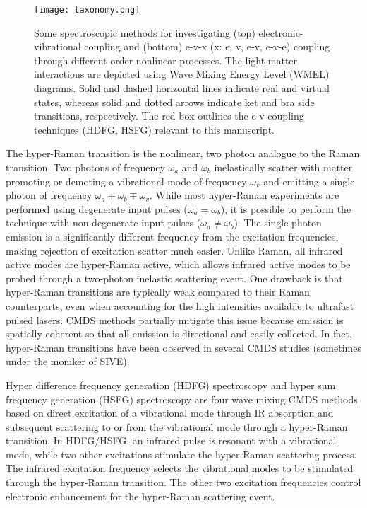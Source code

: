 \documentclass[aip, jcp, reprint, onecolumn, nofootinbib]{revtex4-2}
\begin{document}
\begin{figure}[!htbp]
	\centering
	\texttt{[image: taxonomy.png]}
	\caption{
		Some spectroscopic methods for investigating (top) electronic-vibrational coupling and (bottom) e-v-x (x: e, v, e-v, e-v-e) coupling through different order nonlinear processes.
		The light-matter interactions are depicted using Wave Mixing Energy Level (WMEL) diagrams.\cite{RN286}
		Solid and dashed horizontal lines indicate real and virtual states, whereas solid and dotted arrows indicate ket and bra side transitions, respectively. 
		The red box outlines the e-v coupling techniques (HDFG, HSFG) relevant to this manuscript.
	} 
	\label{fig:comparisonwmel}
\end{figure}

The hyper-Raman transition is the nonlinear, two photon analogue to the Raman transition.\cite{Terhune1965, Cyvin1965, Andrews1978}
Two photons of frequency $\omega_a$ and $\omega_b$ inelastically scatter with matter, promoting or demoting a vibrational mode of frequency $\omega_v$ and emitting a single photon of frequency $\omega_a + \omega_b \mp \omega_v$. 
While most hyper-Raman experiments are performed using degenerate input pulses ($\omega_a = \omega_b$), it is possible to perform the technique with non-degenerate input pulses ($\omega_a \neq \omega_b$). \cite{Denisov1986, Kozich2007}
The single photon emission is a significantly different frequency from the excitation frequencies, making rejection of excitation scatter much easier.
Unlike Raman, all infrared active modes are hyper-Raman active, which allows infrared active modes to be probed through a two-photon inelastic scattering event. \cite{Andrews1978}
One drawback is that hyper-Raman transitions are typically weak compared to their Raman counterparts, even when accounting for the high intensities available to ultrafast pulsed lasers.\cite{RN515, Kelley2010}
CMDS methods partially mitigate this issue because emission is spatially coherent so that all emission is directional and easily collected.
In fact, hyper-Raman transitions have been observed in several CMDS studies (sometimes under the moniker of SIVE).\cite{Zilian1994, RN350, RN416, RN351, RN352, RN353, Chen1998, RN362, RN418, Wang2021, Bonn2024, McDonnell2024}

Hyper difference frequency generation (HDFG) spectroscopy and hyper sum frequency generation (HSFG) spectroscopy are four wave mixing CMDS methods based on direct excitation of a vibrational mode through IR absorption and subsequent scattering to or from the vibrational mode through a hyper-Raman transition.
In HDFG/HSFG, an infrared pulse is resonant with a vibrational mode, while two other excitations stimulate the hyper-Raman scattering process.
The infrared excitation frequency selects the vibrational modes to be stimulated through the hyper-Raman transition.
The other two excitation frequencies control electronic enhancement for the hyper-Raman scattering event.
\end{document}
